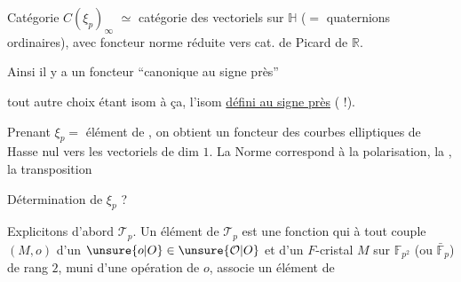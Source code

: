 Catégorie $C(\xi_p)_\infty$  $\simeq$ catégorie des vectoriels   sur
$\mathbb H$ ($=$ quaternions ordinaires), avec
 foncteur norme
réduite vers cat. de Picard de $\mathbb R$.

Ainsi il y a un foncteur ``canonique au signe près''



tout autre choix étant isom
à ça, l'isom \uline{défini au signe près} ( !).

Prenant $\xi_p=$ élément de , on obtient un
foncteur  des courbes elliptiques de Hasse nul
vers les vectoriels  de dim $1$. La  Norme
correspond à la polarisation, la , la transposition


Détermination de $\xi_p$ ?

Explicitons d'abord $\mathcal T_p$. Un élément \inserted{$\xi$} de $\mathcal T_p$ est une
fonction qui à tout couple $(M,o)$ d'un $\unsure{o|O}\in\unsure{\mathcal O|O}$
et d'un $F$-cristal $M$ sur $\mathbb F_{p^2}$ (ou  $\bar{\mathbb F}_p$) de rang $2$,
muni d'une opération de $o$, associe un  élément de

